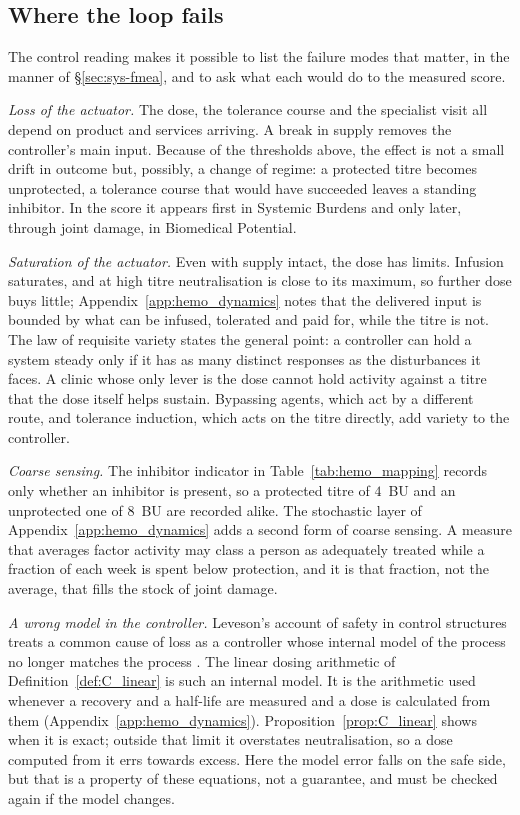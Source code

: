 \subsection{Where the loop fails}

The control reading makes it possible to list the failure modes that matter, in the manner of \S\ref{sec:sys-fmea}, and to ask what each would do to the measured score.

\emph{Loss of the actuator.} The dose, the tolerance course and the specialist visit all depend on product and services arriving. A break in supply removes the controller's main input. Because of the thresholds above, the effect is not a small drift in outcome but, possibly, a change of regime: a protected titre becomes unprotected, a tolerance course that would have succeeded leaves a standing inhibitor. In the score it appears first in Systemic Burdens and only later, through joint damage, in Biomedical Potential.

\emph{Saturation of the actuator.} Even with supply intact, the dose has limits. Infusion saturates, and at high titre neutralisation is close to its maximum, so further dose buys little; Appendix~\ref{app:hemo_dynamics} notes that the delivered input is bounded by what can be infused, tolerated and paid for, while the titre is not. The law of requisite variety \citep{ashby_1956} states the general point: a controller can hold a system steady only if it has as many distinct responses as the disturbances it faces. A clinic whose only lever is the dose cannot hold activity against a titre that the dose itself helps sustain. Bypassing agents, which act by a different route, and tolerance induction, which acts on the titre directly, add variety to the controller.

\emph{Coarse sensing.} The inhibitor indicator in Table~\ref{tab:hemo_mapping} records only whether an inhibitor is present, so a protected titre of $4$~BU and an unprotected one of $8$~BU are recorded alike. The stochastic layer of Appendix~\ref{app:hemo_dynamics} adds a second form of coarse sensing. A measure that averages factor activity may class a person as adequately treated while a fraction of each week is spent below protection, and it is that fraction, not the average, that fills the stock of joint damage.

\emph{A wrong model in the controller.} Leveson's account of safety in control structures treats a common cause of loss as a controller whose internal model of the process no longer matches the process \citep{leveson_2011}. The linear dosing arithmetic of Definition~\ref{def:C_linear} is such an internal model. It is the arithmetic used whenever a recovery and a half-life are measured and a dose is calculated from them (Appendix~\ref{app:hemo_dynamics}). Proposition~\ref{prop:C_linear} shows when it is exact; outside that limit it overstates neutralisation, so a dose computed from it errs towards excess. Here the model error falls on the safe side, but that is a property of these equations, not a guarantee, and must be checked again if the model changes.

